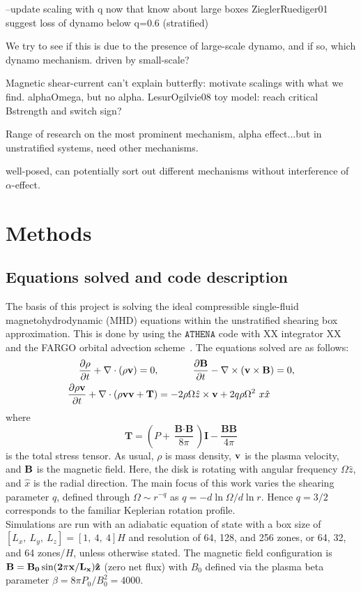 \documentclass{epsconf}
\newcommand{\bb}[1]{\textbf{#1}}
\begin{document}
--update scaling with q now that know about large boxes
ZieglerRuediger01 suggest loss of dynamo below q=0.6 (stratified)

We try to see if this is due to the presence of large-scale dynamo, and if so, which dynamo mechanism. driven by small-scale?

Magnetic shear-current can't explain butterfly: motivate scalings with what we find. alphaOmega, but no alpha. LesurOgilvie08 toy model: reach critical Bstrength and switch sign?

Range of research on the most prominent mechanism, alpha effect...but in unstratified systems, need other mechanisms. 


well-posed, can potentially sort out different mechanisms without interference of $\alpha$-effect. 

\section{Methods}
\subsection{Equations solved and code description}
The basis of this project is solving the ideal compressible single-fluid magnetohydrodynamic (MHD) equations within the unstratified shearing box approximation. This is done by using the $\texttt{ATHENA}$ code with XX integrator XX and the FARGO orbital advection scheme~\cite{ATHENA:Stone+08, StoneGardiner2010}. The equations solved are as follows:
\begin{align*}
    \frac{\partial\rho}{\partial t}+\nabla\cdot(\rho\bb{v})=0, &\hspace{.5in}  \frac{\partial\bb{B}}{\partial t} - \nabla\times(\bb{v}\times\bb{B})=0,\\
    \frac{\partial\rho\bb{v}}{\partial t} + \nabla\cdot(\rho\bb{vv}+\bb{T})&= -2\rho\Omega\hat z\times\bb{v}+2q\rho\Omega^2~x\hat x
\end{align*}
where 
\begin{equation*}
    \bb{T} = \left(P+\frac{\bb{B}\cdot\bb{B}}{8\pi}\right)\bb{I}-\frac{\bb{BB}}{4\pi}
\end{equation*}
is the total stress tensor. As usual, $\rho$ is mass density, $\bf{v}$ is the plasma velocity, and $\bf{B}$ is the magnetic field. Here, the disk is rotating with angular frequency $\Omega\hat z$, and $\hat x$ is the radial direction. The main focus of this work varies the shearing parameter $q$, defined through $\Omega\sim r^{-q}$ as $q=-d\ln\Omega/d\ln r$. Hence $q=3/2$ corresponds to the familiar Keplerian rotation profile.\\
%
Simulations are run with an adiabatic equation of state with a box size of $[L_x,~L_y,~L_z] = [1,~4,~4] H$ and resolution of 64, 128, and 256 zones, or 64, 32, and 64 zones/$H$, unless otherwise stated. The magnetic field configuration is $\bf{B}=B_0\sin(2\pi x/L_x)\hat z$ (zero net flux) with $B_0$ defined via the plasma beta parameter $\beta = 8\pi P_0/B_0^2 = 4000$. 
\end{document}
